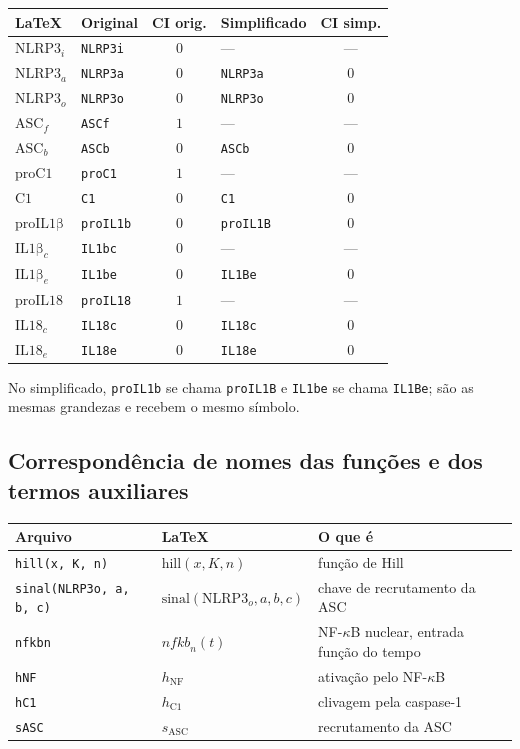 \documentclass[11pt]{article}
\begin{document}
\begin{longtable}{llclc}
\toprule
\LaTeX & Original & CI orig. & Simplificado & CI simp. \\
\midrule
\endhead
$\mathrm{NLRP3}_i$       & \texttt{NLRP3i}  & $0$ & ---               & --- \\
$\mathrm{NLRP3}_a$       & \texttt{NLRP3a}  & $0$ & \texttt{NLRP3a}   & $0$ \\
$\mathrm{NLRP3}_o$       & \texttt{NLRP3o}  & $0$ & \texttt{NLRP3o}   & $0$ \\
$\mathrm{ASC}_f$         & \texttt{ASCf}    & $1$ & ---               & --- \\
$\mathrm{ASC}_b$         & \texttt{ASCb}    & $0$ & \texttt{ASCb}     & $0$ \\
$\mathrm{proC1}$         & \texttt{proC1}   & $1$ & ---               & --- \\
$\mathrm{C1}$            & \texttt{C1}      & $0$ & \texttt{C1}       & $0$ \\
$\mathrm{proIL1\beta}$   & \texttt{proIL1b} & $0$ & \texttt{proIL1B}  & $0$ \\
$\mathrm{IL1\beta}_c$    & \texttt{IL1bc}   & $0$ & ---               & --- \\
$\mathrm{IL1\beta}_e$    & \texttt{IL1be}   & $0$ & \texttt{IL1Be}    & $0$ \\
$\mathrm{proIL18}$       & \texttt{proIL18} & $1$ & ---               & --- \\
$\mathrm{IL18}_c$        & \texttt{IL18c}   & $0$ & \texttt{IL18c}    & $0$ \\
$\mathrm{IL18}_e$        & \texttt{IL18e}   & $0$ & \texttt{IL18e}    & $0$ \\
\bottomrule
\end{longtable}

No simplificado, \texttt{proIL1b} se chama \texttt{proIL1B} e \texttt{IL1be} se chama
\texttt{IL1Be}; são as mesmas grandezas e recebem o mesmo símbolo.

\subsection{Correspondência de nomes das funções e dos termos auxiliares}

\begin{longtable}{lll}
\toprule
Arquivo & \LaTeX & O que é \\
\midrule
\endhead
\texttt{hill(x, K, n)}            & $\mathrm{hill}(x, K, n)$ & função de Hill \\
\texttt{sinal(NLRP3o, a, b, c)}   & $\mathrm{sinal}(\mathrm{NLRP3}_o, a, b, c)$ & chave de recrutamento da ASC \\
\texttt{nfkbn}                    & $\mathit{nfkb}_n(t)$ & NF-$\kappa$B nuclear, entrada função do tempo \\
\texttt{hNF}                      & $h_{\mathrm{NF}}$  & ativação pelo NF-$\kappa$B \\
\texttt{hC1}                      & $h_{\mathrm{C1}}$  & clivagem pela caspase-1 \\
\texttt{sASC}                     & $s_{\mathrm{ASC}}$ & recrutamento da ASC \\
\bottomrule
\end{longtable}
\end{document}
